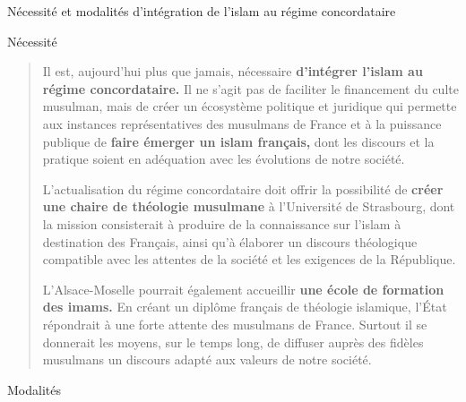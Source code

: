 Nécessité et modalités d'intégration de l'islam au régime concordataire

Nécessité

\begin{quote}
Il est, aujourd'hui plus que jamais, nécessaire \textbf{d'intégrer
l'islam au régime concordataire.} Il ne s'agit pas de faciliter le
financement du culte musulman, mais de créer un écosystème politique et
juridique qui permette aux instances représentatives des musulmans de
France et à la puissance publique de \textbf{faire émerger un islam
français,} dont les discours et la pratique soient en adéquation avec
les évolutions de notre société.

L'actualisation du régime concordataire doit offrir la possibilité de
\textbf{créer une chaire de théologie musulmane} à l'Université de
Strasbourg, dont la mission consisterait à produire de la connaissance
sur l'islam à destination des Français, ainsi qu'à élaborer un discours
théologique compatible avec les attentes de la société et les exigences
de la République.

L'Alsace-Moselle pourrait également accueillir \textbf{une école de
formation des imams.} En créant un diplôme français de théologie
islamique, l'État répondrait à une forte attente des musulmans de
France. Surtout il se donnerait les moyens, sur le temps long, de
diffuser auprès des fidèles musulmans un discours adapté aux valeurs de
notre société.
\end{quote}

Modalités

